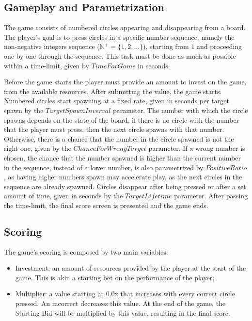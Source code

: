 \subsection{Gameplay and Parametrization} 
The game consists of numbered circles appearing and disappearing from a board. The player's goal is to press circles in a specific number sequence, namely the non-negative integers sequence ($\mathbb{N}^+ = \{1, 2, ...\}$), starting from $1$ and proceeding one by one through the sequence. This task must be done as much as possible within a time-limit, given by $TimeForGame$ in seconds.

Before the game starts the player must provide an amount to invest on the game, from the available resources. After submitting the value, the game starts. Numbered circles start spawning at a fixed rate, given in seconds per target spawn by the $TargetSpawnInverval$ parameter. The number with which the circle spawns depends on the state of the board, if there is no circle with the number that the player must press, then the next circle spawns with that number. Otherwise, there is a chance that the number in the circle spawned is not the right one, given by the $ChanceForWrongTarget$ parameter. If a wrong number is chosen, the chance that the number spawned is higher than the current number in the sequence, instead of a lower number, is also parametrized by $Positive Ratio$, as having higher numbers spawn may accelerate play, as the next circles in the sequence are already spawned. Circles disappear after being pressed or after a set amount of time, given in seconds by the $TargetLifetime$ parameter. After passing the time-limit, the final score screen is presented and the game ends.


\subsection{Scoring}
\label{subsec:Scoring}
The game's scoring is composed by two main variables:
\begin{itemize}
    \item Investment: an amount of resources provided by the player at the start of the game. This is akin a starting bet on the performance of the player; 
    \item Multiplier: a value starting at 0.0x that increases with every correct circle pressed. An incorrect decreases this value. At the end of the game, the Starting Bid will be multiplied by this value, resulting in the final score.
\end{itemize}

